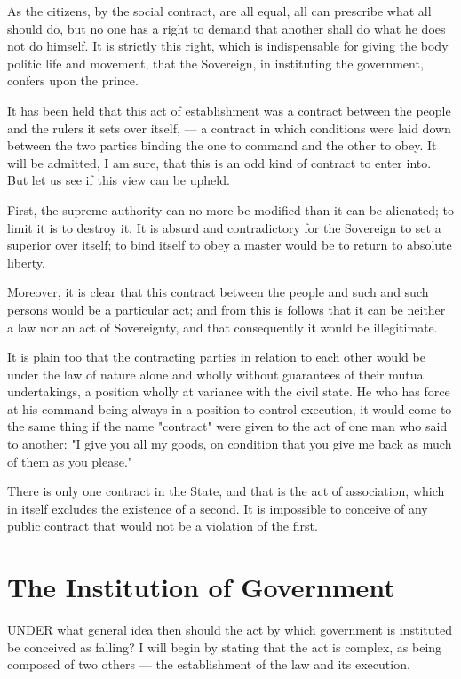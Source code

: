 \documentclass[12pt]{book}
\begin{document}
As the citizens, by the social contract, are all equal, all can prescribe what all should do, but no one has a right to demand that another shall do what he does not do himself. It is strictly this right, which is indispensable for giving the body politic life and movement, that the Sovereign, in instituting the government, confers upon the prince.

It has been held that this act of establishment was a contract between the people and the rulers it sets over itself, — a contract in which conditions were laid down between the two parties binding the one to command and the other to obey. It will be admitted, I am sure, that this is an odd kind of contract to enter into. But let us see if this view can be upheld.

First, the supreme authority can no more be modified than it can be alienated; to limit it is to destroy it. It is absurd and contradictory for the Sovereign to set a superior over itself; to bind itself to obey a master would be to return to absolute liberty.

Moreover, it is clear that this contract between the people and such and such persons would be a particular act; and from this is follows that it can be neither a law nor an act of Sovereignty, and that consequently it would be illegitimate.

It is plain too that the contracting parties in relation to each other would be under the law of nature alone and wholly without guarantees of their mutual undertakings, a position wholly at variance with the civil state. He who has force at his command being always in a position to control execution, it would come to the same thing if the name "contract" were given to the act of one man who said to another: "I give you all my goods, on condition that you give me back as much of them as you please."

There is only one contract in the State, and that is the act of association, which in itself excludes the existence of a second. It is impossible to conceive of any public contract that would not be a violation of the first.

\section{The Institution of Government}
UNDER what general idea then should the act by which government is instituted be conceived as falling? I will begin by stating that the act is complex, as being composed of two others — the establishment of the law and its execution.
\end{document}
